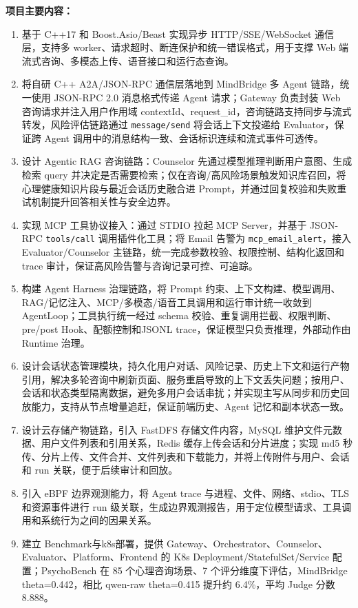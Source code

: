 \documentclass[10pt]{article}
\begin{document}
{\vspace{0.10em}
\textbf{项目主要内容：}
\begin{enumerate}
    \item 基于 C++17 和 Boost.Asio/Beast 实现异步 HTTP/SSE/WebSocket 通信层，支持多 worker、请求超时、断连保护和统一错误格式，用于支撑 Web 端流式咨询、多模态上传、语音接口和运行态查询。
    \item 将自研 C++ A2A/JSON-RPC 通信层落地到 MindBridge 多 Agent 链路，统一使用 JSON-RPC 2.0 消息格式传递 Agent 请求；Gateway 负责封装 Web 咨询请求并注入用户作用域 contextId、request\_id，咨询链路支持同步与流式转发，风险评估链路通过 \texttt{message/send} 将会话上下文投递给 Evaluator，保证跨 Agent 调用中的消息结构一致、会话标识连续和流式事件可透传。
    \item 设计 Agentic RAG 咨询链路：Counselor 先通过模型推理判断用户意图、生成检索 query 并决定是否需要检索；仅在咨询/高风险场景触发知识库召回，将心理健康知识片段与最近会话历史融合进 Prompt，并通过回复校验和失败重试机制提升回答相关性与安全边界。
    \item 实现 MCP 工具协议接入：通过 STDIO 拉起 MCP Server，并基于 JSON-RPC \texttt{tools/call} 调用插件化工具；将 Email 告警为 \texttt{mcp\_email\_alert}，接入 Evaluator/Counselor 主链路，统一完成参数校验、权限控制、结构化返回和 trace 审计，保证高风险告警与咨询记录可控、可追踪。
    \item 构建 Agent Harness 治理链路，将 Prompt 约束、上下文构建、模型调用、RAG/记忆注入、MCP/多模态/语音工具调用和运行审计统一收敛到 AgentLoop；工具执行统一经过 schema 校验、重复调用拦截、权限判断、pre/post Hook、配额控制和JSONL trace，保证模型只负责推理，外部动作由 Runtime 治理。
    \item 设计会话状态管理模块，持久化用户对话、风险记录、历史上下文和运行产物引用，解决多轮咨询中刷新页面、服务重启导致的上下文丢失问题；按用户、会话和状态类型隔离数据，避免多用户会话串扰；并实现主写从同步和历史回放能力，支持从节点增量追赶，保证前端历史、Agent 记忆和副本状态一致。
    \item 设计云存储产物链路，引入 FastDFS 存储文件内容，MySQL 维护文件元数据、用户文件列表和引用关系，Redis 缓存上传会话和分片进度；实现 md5 秒传、分片上传、文件合并、文件列表和下载能力，并将上传附件与用户、会话和 run 关联，便于后续审计和回放。
    \item 引入 eBPF 边界观测能力，将 Agent trace 与进程、文件、网络、stdio、TLS 和资源事件进行 run 级关联，生成边界观测报告，用于定位模型请求、工具调用和系统行为之间的因果关系。
    \item 建立 Benchmark与k8s部署，提供 Gateway、Orchestrator、Counselor、Evaluator、Platform、Frontend 的 K8s Deployment/StatefulSet/Service 配置；PsychoBench 在 85 个心理咨询场景、7 个评分维度下评估，MindBridge theta=0.442，相比 qwen-raw theta=0.415 提升约 6.4\%，平均 Judge 分数 8.888。
\end{enumerate}

}
\end{document}
